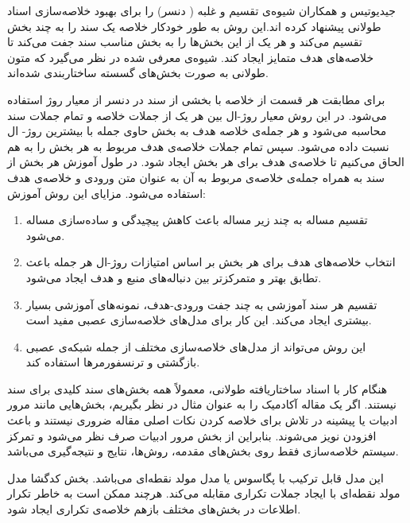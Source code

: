 
جیدیوتیس و همکاران شیوه‌ی تقسیم و غلبه ( دنسر)
را برای بهبود خلاصه‌سازی اسناد طولانی پیشنهاد کرده اند.این روش به طور خودکار خلاصه یک سند را به چند بخش‌ تقسیم می‌کند و هر یک از این بخش‌ها را به بخش مناسب سند جفت می‌کند تا خلاصه‌های هدف متمایز ایجاد کند. شیوه‌ی معرفی شده در نظر می‌گیرد که متون طولانی به صورت بخش‌های گسسته ساختاربندی شده‌اند. 

برای مطابقت هر قسمت از خلاصه با بخشی از سند در دنسر از معیار روژ
استفاده ‌می‌شود. در این روش معیار روژ-ال بین هر یک از جملات خلاصه و تمام جملات سند محاسبه می‌شود و هر جمله‌ی خلاصه هدف به بخش حاوی جمله با بیشترین روژ- ال نسبت داده می‌شود. 
سپس تمام جملات خلاصه‌ی هدف مربوط به هر بخش را به هم الحاق می‌کنیم تا خلاصه‌ی هدف برای هر بخش ایجاد شود. در طول آموزش هر بخش از سند به همراه جمله‌ی خلاصه‌ی مربوط به آن به عنوان متن ورودی و خلاصه‌ی هدف استفاده می‌شود. 
مزایای این روش آموزش:
\begin{enumerate}
	\item {
		تقسیم مساله به چند زیر مساله باعث کاهش پیچیدگی و ساده‌سازی مساله می‌شود.
	}
	\item {
		انتخاب خلاصه‌های هدف برای هر بخش بر اساس امتیازات روژ-ال هر جمله باعث تطابق بهتر و متمرکزتر بین دنباله‌های منبع و هدف ایجاد می‌شود.
	}
	\item {
		تقسیم هر سند آموزشی به چند جفت ورودی-هدف، نمونه‌های آموزشی بسیار بیشتری ایجاد می‌کند. این کار برای مدل‌های خلاصه‌سازی عصبی مفید است. 	
	}
	\item {
		این روش می‌تواند از مدل‌های خلاصه‌سازی مختلف از جمله شبکه‌ی عصبی بازگشتی و ترنسفورمرها استفاده کند.
	}
\end{enumerate}


هنگام کار با اسناد ساختاریافته طولانی، معمولاً همه بخش‌های سند کلیدی برای سند نیستند. اگر یک مقاله آکادمیک را به عنوان مثال در نظر بگیریم، بخش‌هایی مانند مرور ادبیات یا پیشینه در تلاش برای خلاصه کردن نکات اصلی مقاله ضروری نیستند و باعث افزودن نویز می‌شوند. بنابراین از بخش مرور ادبیات صرف نظر می‌شود و تمرکز سیستم خلاصه‌سازی فقط روی بخش‌های مقدمه، روش‌ها، نتایج و نتیجه‌گیری می‌باشد.

این مدل قابل ترکیب با پگاسوس یا مدل مولد نقطه‌ای
می‌باشد.
بخش کدگشا مدل مولد نقطه‌ای با ایجاد جملات تکراری مقابله ‌می‌کند.
هرچند ممکن است به خاطر تکرار اطلاعات در بخش‌های مختلف بازهم خلاصه‌ی تکراری ایجاد شود.

